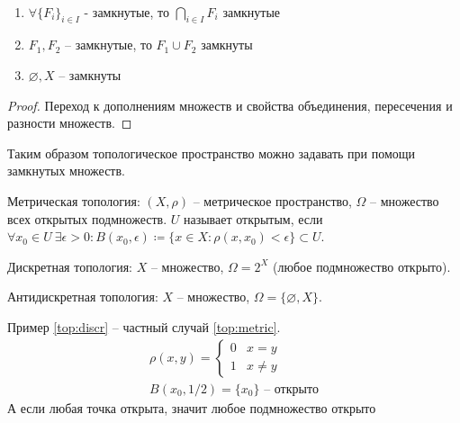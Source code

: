 \documentclass[main]{subfiles}
\begin{document}
\begin{theorem}
    \

    \begin{enumerate}
        \item $\forall \{F_i\}_{i \in I}$ - замкнутые, то $\bigcap_{i\in I} F_i$ замкнутые
        \item $F_1, F_2$ -- замкнутые, то $F_1 \cup F_2$ замкнуты
        \item $\varnothing, X$ -- замкнуты
    \end{enumerate}
\end{theorem}
\begin{proof}
    Переход к дополнениям множеств и свойства объединения, пересечения и разности множеств.
\end{proof}

Таким образом топологическое пространство можно задавать при помощи замкнутых множеств.

\begin{example}\label{top:metric}
    Метрическая топология:  $(X, \rho)$ -- метрическое пространство, $\Omega$ -- множество всех открытых подмножеств.
    $U$ называет открытым, если $\forall x_0 \in U\ \exists \epsilon > 0: B(x_0, \epsilon) \coloneqq \{x \in X : \rho(x, x_0) < \epsilon\} \subset U$.
\end{example}

\begin{example}\label{top:discr}
    Дискретная топология: $X$ -- множество, $\Omega= 2^X$ (любое подмножество открыто).
\end{example}

\begin{example}
    Антидискретная топология: $X$ -- множество, $\Omega = \{ \varnothing, X\}$.
\end{example}

\begin{remark}
    Пример \ref{top:discr} -- частный случай \ref{top:metric}.
    \begin{gather*}
        \rho(x,y)  = \begin{cases}
            0 & x = y    \\
            1 & x \neq y
        \end{cases}\\
        B(x_0, 1/2) = \{x_0\} \text{ -- открыто}
    \end{gather*}
    А если любая точка открыта, значит любое подмножество открыто
\end{remark}
\end{document}
